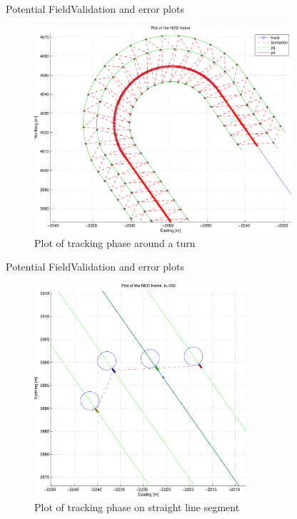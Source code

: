 \documentclass[10pt,handout]{beamer}
\begin{document}
\begin{frame}{Potential Field}{Validation and error plots}
  \begin{figure}
    \includegraphics[width=0.85\textwidth]{img/pdftotalligeplussving}
    \caption{Plot of tracking phase around a turn}
  \end{figure}
\end{frame}

\begin{frame}{Potential Field}{Validation and error plots}
  \begin{figure}
    \includegraphics[width=0.7\textwidth]{img/pdfligestykke}
    \caption{Plot of tracking phase on straight line segment}
  \end{figure}
\end{frame}
\end{document}
